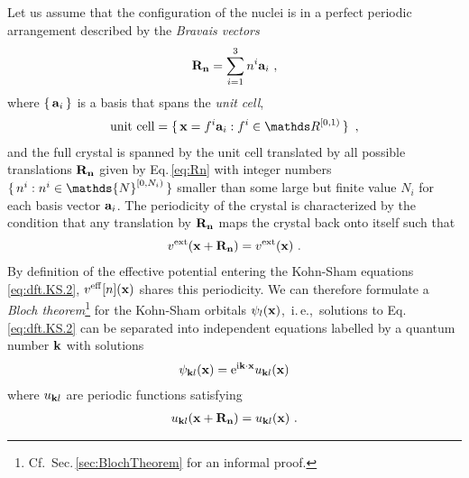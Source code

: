 \documentclass[a4paper,12pt]{book}
\newcommand{\im}{{\rm i}}
\begin{document}
Let us assume that the configuration of the nuclei is in a perfect periodic arrangement described by the 
\emph{Bravais vectors}
\begin{align}
	{\bf R}_{\bf n} 
		= \sum_{i=1}^{3} n^i {\bf a}_i~,
	\label{eq:Rn}
\end{align}
where $\set{{\bf a}_i}$ is a basis that spans
the \emph{unit cell},
\begin{align}
	\text{unit cell}
		= \set{{\bf x} = f^i {\bf a}_i : f^i \in \mathds R^{[0, 1)}}~,
	\label{eq:dft.Bloch.unitcell}
\end{align}
and the full crystal is spanned by the unit cell translated by all possible translations $\bf R_n$ given by Eq.\,\eqref{eq:Rn} with integer numbers $\set{n^i : n^i \in \mathds{N}^{[0, N_i)}}$ smaller than some large but finite value $N_i$ for each basis vector ${\bf a}_i$. The periodicity of the crystal is characterized by the condition that any translation by $\bf R_n$ maps the crystal back onto itself such that
\begin{align}
	v^{\rm ext} ({\bf x} + {\bf R_n}) 
		= v^{\rm ext} ({\bf x})~.
	\label{eq:dft.Bloch.1}
\end{align}
By definition of the effective potential entering the Kohn-Sham equations \eqref{eq:dft.KS.2}, $v^{\rm eff} [n] ({\bf x})$ shares this periodicity. We can therefore formulate a \emph{Bloch theorem}\footnote{Cf.~Sec.\,\ref{sec:BlochTheorem} for an informal proof.}
for the Kohn-Sham orbitals $\psi_l ({\bf x})$,~i.\,e.,~solutions to Eq.\,\eqref{eq:dft.KS.2} can be separated into independent equations labelled by a quantum number $\bf k$ with solutions
\begin{align}
	\psi_{{\bf k} l} ({\bf x}) 
		= {\rm e}^{\im {\bf k} \cdot {\bf x}} u_{{\bf k} l} ({\bf x})
	\label{eq:dft.Bloch.2}
\end{align}
where $u_{{\bf k} l}$ are periodic functions satisfying
\begin{align}
	u_{{\bf k} l} ({\bf x} + {\bf R_n})
		= u_{{\bf k} l} ({\bf x})~.
	\label{eq:dft.Bloch.3}
\end{align}
\end{document}
